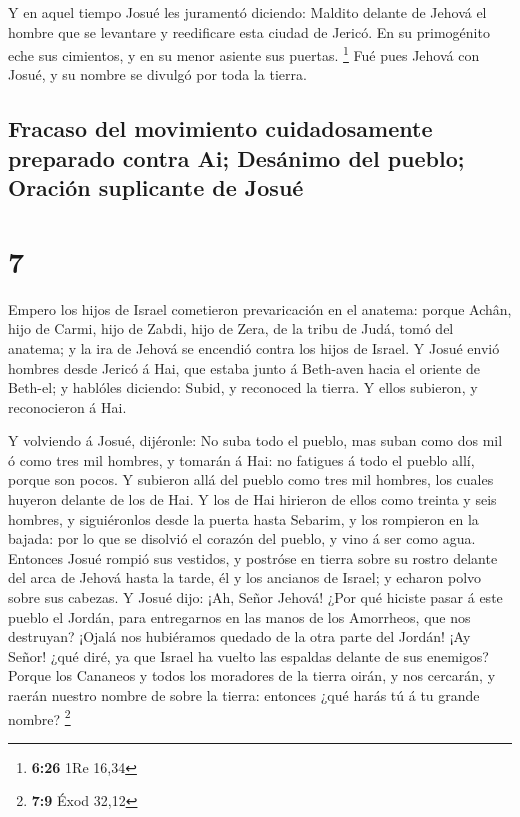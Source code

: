  Y en aquel tiempo Josué les juramentó diciendo: Maldito
delante de Jehová el hombre que se levantare y reedificare esta ciudad
de Jericó. En su primogénito eche sus cimientos, y en su menor asiente
sus puertas. \footnote{\textbf{6:26} 1Re 16,34}  Fué pues
Jehová con Josué, y su nombre se divulgó por toda la tierra.

\hypertarget{fracaso-del-movimiento-cuidadosamente-preparado-contra-ai-desuxe1nimo-del-pueblo-oraciuxf3n-suplicante-de-josuuxe9}{%
\subsection{Fracaso del movimiento cuidadosamente preparado contra Ai;
Desánimo del pueblo; Oración suplicante de
Josué}\label{fracaso-del-movimiento-cuidadosamente-preparado-contra-ai-desuxe1nimo-del-pueblo-oraciuxf3n-suplicante-de-josuuxe9}}

\hypertarget{section-6}{%
\section{7}\label{section-6}}

 Empero los hijos de Israel cometieron prevaricación en el
anatema: porque Achân, hijo de Carmi, hijo de Zabdi, hijo de Zera, de la
tribu de Judá, tomó del anatema; y la ira de Jehová se encendió contra
los hijos de Israel.  Y Josué envió hombres desde Jericó á
Hai, que estaba junto á Beth-aven hacia el oriente de Beth-el; y
hablóles diciendo: Subid, y reconoced la tierra. Y ellos subieron, y
reconocieron á Hai.

 Y volviendo á Josué, dijéronle: No suba todo el pueblo,
mas suban como dos mil ó como tres mil hombres, y tomarán á Hai: no
fatigues á todo el pueblo allí, porque son pocos.  Y
subieron allá del pueblo como tres mil hombres, los cuales huyeron
delante de los de Hai.  Y los de Hai hirieron de ellos
como treinta y seis hombres, y siguiéronlos desde la puerta hasta
Sebarim, y los rompieron en la bajada: por lo que se disolvió el corazón
del pueblo, y vino á ser como agua.  Entonces Josué rompió
sus vestidos, y postróse en tierra sobre su rostro delante del arca de
Jehová hasta la tarde, él y los ancianos de Israel; y echaron polvo
sobre sus cabezas.  Y Josué dijo: ¡Ah, Señor Jehová! ¿Por
qué hiciste pasar á este pueblo el Jordán, para entregarnos en las manos
de los Amorrheos, que nos destruyan? ¡Ojalá nos hubiéramos quedado de la
otra parte del Jordán!  ¡Ay Señor! ¿qué diré, ya que
Israel ha vuelto las espaldas delante de sus enemigos? 
Porque los Cananeos y todos los moradores de la tierra oirán, y nos
cercarán, y raerán nuestro nombre de sobre la tierra: entonces ¿qué
harás tú á tu grande nombre? \footnote{\textbf{7:9} Éxod 32,12}

